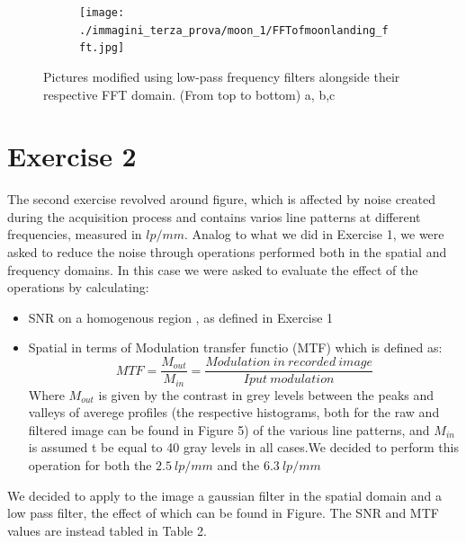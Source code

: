 \documentclass{article}
\begin{document}
\begin{figure}[h]
\begin{subfigure}[b]{0.5\textwidth}
\end{subfigure}%
\begin{subfigure}[b]{0.5\textwidth}
	\centering
	\texttt{[image: ./immagini\_terza\_prova/moon\_1/FFTofmoonlanding\_fft.jpg]}
	
\end{subfigure}%

\bigbreak

	\caption{Pictures modified using low-pass frequency filters alongside their respective FFT domain. (From top to bottom) a, b,c}\label{two}
\end{figure}
\clearpage




\section*{Exercise 2}
The second exercise revolved around figure, which is affected by noise created during the acquisition process and contains varios line patterns at different frequencies, measured in $lp/ mm$. Analog to what we did in Exercise 1, we were asked to reduce the noise through operations performed both in the spatial and frequency domains. In this case we were asked to evaluate the effect of the operations by calculating:
\begin{itemize}
\item SNR on a homogenous region , as defined in Exercise 1
\item Spatial  in terms of Modulation transfer functio (MTF) which is defined as:
\begin{equation}
MTF=\frac{M_{out}}{M_{in}}=\frac{Modulation\ in\ recorded\ image}{Iput\ modulation}
\end{equation}
Where $M_{out}$ is given by the contrast in grey levels between the peaks and valleys of averege profiles (the respective histograms, both for the raw and filtered image can be found in Figure 5) of the various line patterns, and $M_{in}$ is assumed t be equal to 40 gray levels in all cases.We decided to perform this operation for both the $2.5\ lp/mm$ and the 
$6.3\ lp/mm$
\end{itemize}
We decided to apply to the image a gaussian filter in the spatial domain 
and a low pass filter, the effect of which can be found in Figure. The SNR and MTF values are instead tabled in Table 2.
\\
\end{document}
